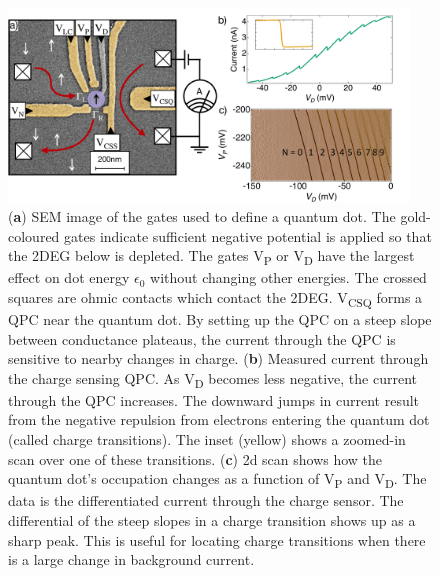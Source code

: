 \begin{figure}[!htb]
 \begin{center}
  \includegraphics[width=0.95\textwidth]{figures/ch1/figure6.pdf}
  \caption[Charge Sensing a Quantum Dot]{\label{fig:ch1/ct_intro} 
  (\textbf{a}) SEM image of the gates used to define a quantum dot. The gold-coloured gates indicate sufficient negative potential is applied so that the 2DEG below is depleted. The gates V\textsubscript{P} or V\textsubscript{D} have the largest effect on dot energy $\epsilon_0$ without changing other energies. The crossed squares are ohmic contacts which contact the 2DEG. V\textsubscript{CSQ} forms a QPC near the quantum dot. By setting up the QPC on a steep slope between conductance plateaus, the current through the QPC is sensitive to nearby changes in charge. (\textbf{b}) Measured current through the charge sensing QPC. As V\textsubscript{D} becomes less negative, the current through the QPC increases. The downward jumps in current result from the negative repulsion from electrons entering the quantum dot (called charge transitions). The inset (yellow) shows a zoomed-in scan over one of these transitions. (\textbf{c}) 2d scan shows how the quantum dot's occupation changes as a function of V\textsubscript{P} and V\textsubscript{D}. The data is the differentiated current through the charge sensor. The differential of the steep slopes in a charge transition shows up as a sharp peak. This is useful for locating charge transitions when there is a large change in background current. 
   }
 \end{center}
\end{figure}


